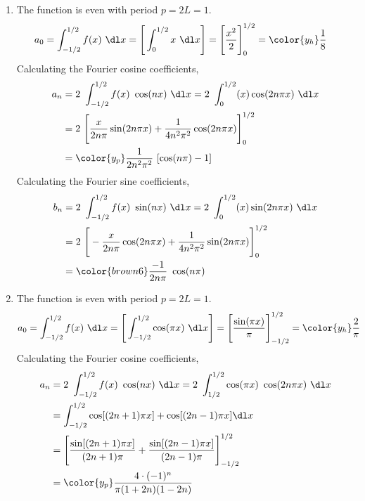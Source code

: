 \begin{enumerate}
    \item The function is even with period $ p = 2L = 1 $.
          \begin{align}
              a_0 & = \int_{-1/2}^{1/2} f(x)\ \dl x
              = \Bigg[\int_{0}^{1/2} x\ \dl x \Bigg]
              = \Bigg[ \frac{x^2}{2} \Bigg]_{0}^{1/2}
              = \color{y_h} \frac{1}{8}
          \end{align}
          Calculating the Fourier cosine coefficients,
          \begin{align}
              a_n & = 2\ \int_{-1/2}^{1/2} f(x)\ \cos(nx)\ \dl x
              = 2\ \int_{0}^{1/2} (x) \cos(2n\pi x)\ \dl x              \\
                  & = 2\ \Bigg[ \frac{x}{2n \pi} \sin(2n\pi x)
              + \frac{1}{4n^2 \pi^2} \cos(2n\pi x) \Bigg]_{0}^{1/2}     \\
                  & = \color{y_p} \frac{1}{2n^2\pi^2}\ [\cos(n\pi) - 1]
          \end{align}
          Calculating the Fourier sine coefficients,
          \begin{align}
              b_n & = 2\ \int_{-1/2}^{1/2} f(x)\ \sin(nx)\ \dl x
              = 2\ \int_{0}^{1/2} (x) \sin(2n\pi x)\ \dl x          \\
                  & = 2\ \Bigg[ -\frac{x}{2n \pi} \cos(2n\pi x)
              + \frac{1}{4n^2 \pi^2} \sin(2n\pi x) \Bigg]_{0}^{1/2} \\
                  & = \color{brown6} \frac{-1}{2n\pi}\ \cos(n\pi)
          \end{align}

    \item The function is even with period $ p = 2L = 1 $.
          \begin{align}
              a_0 & = \int_{-1/2}^{1/2} f(x)\ \dl x
              = \Bigg[\int_{-1/2}^{1/2} \cos(\pi x)\ \dl x \Bigg]
              = \Bigg[ \frac{\sin(\pi x)}{\pi} \Bigg]_{-1/2}^{1/2}
              = \color{y_h} \frac{2}{\pi}
          \end{align}
          Calculating the Fourier cosine coefficients,
          \begin{align}
              a_n & = 2\ \int_{-1/2}^{1/2} f(x)\ \cos(nx)\ \dl x
              = 2\ \int_{1/2}^{1/2} \cos(\pi x)\ \cos(2n\pi x)\ \dl x         \\
                  & = \int_{-1/2}^{1/2} \cos[(2n+1)\pi x]
              + \cos[(2n-1)\pi  x] \dl x                                      \\
                  & = \Bigg[ \frac{\sin[(2n+1)\pi x]}{(2n+1)\pi}
              + \frac{\sin[(2n-1)\pi x]}{(2n-1)\pi}  \Bigg]_{-1/2}^{1/2}      \\
                  & = \color{y_p} \frac{4 \cdot (-1)^n }{\pi(1 + 2n)(1 - 2n)}
          \end{align}


\end{enumerate}
